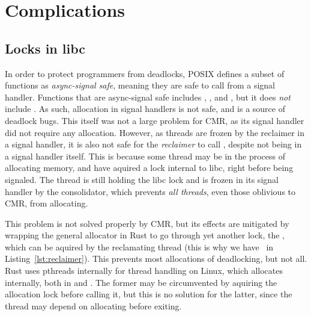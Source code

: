 \begin{figure}[hb]
  
\end{figure}

\section{Complications}


\subsection{Locks in libc\label{sec:alloc-lock}}

In order to protect programmers from deadlocks, POSIX defines a subset of functions as
\emph{async-signal safe}, meaning they are safe to call from a signal handler. Functions that are
async-signal safe includes , , and , but it does \emph{not}
include . As such, allocation in signal handlers is not safe, and is a source of
deadlock bugs. This itself was not a large problem for CMR, as its signal handler did not require
any allocation. However, as threads are frozen by the reclaimer in a signal handler, it is also not
safe for the \emph{reclaimer} to call , despite not being in a signal handler itself.
This is because some thread may be in the process of allocating memory, and have aquired a lock
internal to libc, right before being signaled. The thread is still holding the libc lock and is
frozen in its signal handler by the consolidator, which prevents \emph{all threads}, even those
oblivious to CMR, from allocating.

This problem is not solved properly by CMR, but its effects are mitigated by wrapping the general
allocator in Rust to go through yet another lock, the , which can be aquired by
the reclamating thread (this is why we have~ in Listing~\ref{lst:reclaimer}). This
prevents most allocations of deadlocking, but not all. Rust uses pthreads internally for thread
handling on Linux, which allocates internally, both in  and . The former may
be circumvented by aquiring the allocation lock before calling it, but this is no solution for the
latter, since the thread may depend on allocating before exiting.





